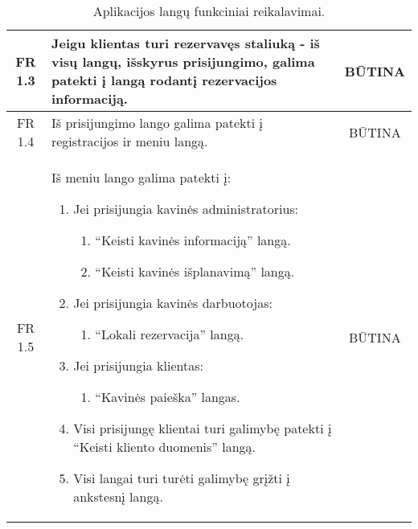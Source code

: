 \documentclass{VUMIFPSkursinis}
\begin{document}
\begin{center}
\begin{table}[H]
\begin{tabular}{|p{2cm}|p{}|p{}|}
		\multicolumn{1}{|c|}{FR 1.3}&
		{Jeigu klientas turi rezervavęs staliuką - iš visų langų, išskyrus \newline prisijungimo, galima patekti į langą rodantį rezervacijos informaciją.}&
		\multicolumn{1}{|c|}{BŪTINA}\\
	\hline
		\multicolumn{1}{|c|}{FR 1.4}&
		{Iš prisijungimo lango galima patekti į registracijos ir meniu langą.}&
		\multicolumn{1}{|c|}{BŪTINA}\\
	\hline
		\multicolumn{1}{|c|}{FR 1.5}&
		{Iš meniu lango galima patekti į:\newline
		\begin{enumerate}
			\item Jei prisijungia kavinės administratorius:
				\begin{enumerate}
					\item “Keisti kavinės informaciją” langą.
					\item “Keisti kavinės išplanavimą” langą.
				\end{enumerate}
			\item Jei prisijungia kavinės darbuotojas:
				\begin{enumerate}
					\item “Lokali rezervacija” langą.
				\end{enumerate}
			\item Jei prisijungia klientas:
				\begin{enumerate}
					\item “Kavinės paieška” langas.
				\end{enumerate}
			\item Visi prisijungę klientai turi galimybę patekti į “Keisti kliento duomenis” langą.
			\item Visi langai turi turėti galimybę grįžti į ankstesnį langą.
		\end{enumerate}
		}&
		\multicolumn{1}{|c|}{BŪTINA}\\		
	\hline
	
	\end{tabular}
	\caption{Aplikacijos langų funkciniai reikalavimai.}
	\label{table:AplikacijosLangai}
	\end{table}
	
\end{center}

\pagebreak
\end{document}
